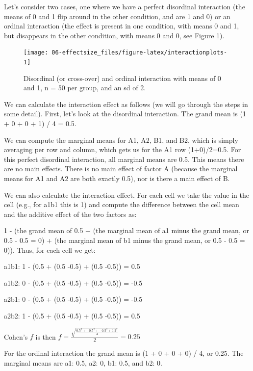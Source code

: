 \documentclass[
  oneside]{book}
\begin{document}
Let's consider two cases, one where we have a perfect disordinal interaction (the means of 0 and 1 flip around in the other condition, and are 1 and 0) or an ordinal interaction (the effect is present in one condition, with means 0 and 1, but disappears in the other condition, with means 0 and 0, see Figure \ref{fig:interactionplots}).



\begin{figure}

{\centering \texttt{[image: 06-effectsize\_files/figure-latex/interactionplots-1]} 

}

\caption{Disordinal (or cross-over) and ordinal interaction with means of 0 and 1, n = 50 per group, and an sd of 2.}\label{fig:interactionplots}
\end{figure}

We can calculate the interaction effect as follows (we will go through the steps in some detail). First, let's look at the disordinal interaction. The grand mean is (1 + 0 + 0 + 1) / 4 = 0.5.

We can compute the marginal means for A1, A2, B1, and B2, which is simply averaging per row and column, which gets us for the A1 row (1+0)/2=0.5. For this perfect disordinal interaction, all marginal means are 0.5. This means there are no main effects. There is no main effect of factor A (because the marginal means for A1 and A2 are both exactly 0.5), nor is there a main effect of B.

We can also calculate the interaction effect. For each cell we take the value in the cell (e.g., for a1b1 this is 1) and compute the difference between the cell mean and the additive effect of the two factors as:

1 - (the grand mean of 0.5 + (the marginal mean of a1 minus the grand mean, or 0.5 - 0.5 = 0) + (the marginal mean of b1 minus the grand mean, or 0.5 - 0.5 = 0)). Thus, for each cell we get:

a1b1: 1 - (0.5 + (0.5 -0.5) + (0.5 -0.5)) = 0.5

a1b2: 0 - (0.5 + (0.5 -0.5) + (0.5 -0.5)) = -0.5

a2b1: 0 - (0.5 + (0.5 -0.5) + (0.5 -0.5)) = -0.5

a2b2: 1 - (0.5 + (0.5 -0.5) + (0.5 -0.5)) = 0.5

Cohen's \(f\) is then \(f = \frac { \sqrt { \frac { 0.5^2 +-0.5^2 + -0.5^2 + 0.5^2 } { 4 } }}{ 2 } = 0.25\)

For the ordinal interaction the grand mean is (1 + 0 + 0 + 0) / 4, or 0.25. The marginal means are a1: 0.5, a2: 0, b1: 0.5, and b2: 0.
\end{document}
